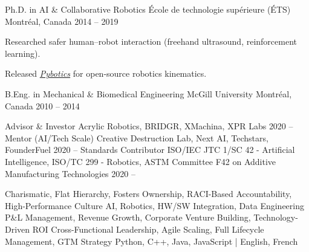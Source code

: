 \documentclass[11pt, letterpaper]{awesome-cv}
\begin{document}
\cventry
    {Ph.D. in AI \& Collaborative Robotics}
    {École de technologie supérieure (ÉTS)}
    {Montréal, Canada}
    {2014 -- 2019}
    {
      \begin{cvitems}
        \item {Researched safer human–robot interaction (freehand ultrasound, reinforcement learning).}
        \item {Released \href{https://github.com/EngNadeau/pybotics}{\textit{Pybotics}} for open-source robotics kinematics.}
      \end{cvitems}
    }

\cventry
    {B.Eng. in Mechanical \& Biomedical Engineering}
    {McGill University}
    {Montréal, Canada}
    {2010 -- 2014}
    {}

\begin{cvhonors}
  \cvhonor
    {Advisor \& Investor}
    {Acrylic Robotics, BRIDGR, XMachina, XPR Labs}
    {}
    {2020 -- }
  \cvhonor
    {Mentor (AI/Tech Scale)}
    {Creative Destruction Lab, Next AI, Techstars, FounderFuel}
    {}
    {2020 -- }
  \cvhonor
    {Standards Contributor}
    {ISO/IEC JTC 1/SC 42 - Artificial Intelligence,
    ISO/TC 299 - Robotics,
    ASTM Committee F42 on Additive Manufacturing Technologies}
    {}
    {2020 -- }
\end{cvhonors}

\begin{cvskills}
    {Charismatic, Flat Hierarchy, Fosters Ownership, RACI-Based Accountability, High-Performance Culture}
    {AI, Robotics, HW/SW Integration, Data Engineering}
    {P\&L Management, Revenue Growth, Corporate Venture Building, Technology-Driven ROI}
    {Cross-Functional Leadership, Agile Scaling, Full Lifecycle Management, GTM Strategy}
    {Python, C++, Java, JavaScript | English, French}
\end{cvskills}
\end{document}
